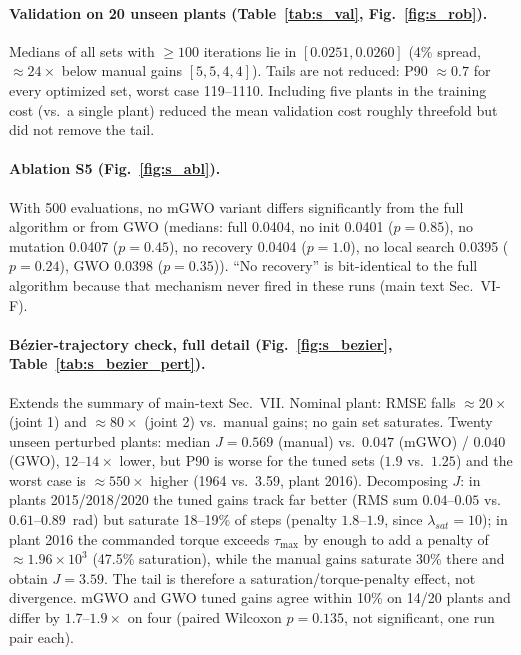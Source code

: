 \documentclass[10pt,journal,compsoc]{IEEEtran}
\newcommand{\mgwo}{mGWO}
\begin{document}
\paragraph{Validation on 20 unseen plants (Table~\ref{tab:s_val}, Fig.~\ref{fig:s_rob}).} Medians of all sets with $\ge100$ iterations lie in $[0.0251,0.0260]$ (4\% spread, $\approx24\times$ below manual gains $[5,5,4,4]$). Tails are not reduced: P90 $\approx0.7$ for every optimized set, worst case 119--1110. Including five plants in the training cost (vs.\ a single plant) reduced the mean validation cost roughly threefold but did not remove the tail.

\paragraph{Ablation S5 (Fig.~\ref{fig:s_abl}).} With 500 evaluations, no \mgwo{} variant differs significantly from the full algorithm or from GWO (medians: full 0.0404, no init 0.0401 ($p=0.85$), no mutation 0.0407 ($p=0.45$), no recovery 0.0404 ($p=1.0$), no local search 0.0395 ($p=0.24$), GWO 0.0398 ($p=0.35$)). ``No recovery'' is bit-identical to the full algorithm because that mechanism never fired in these runs (main text Sec.~VI-F).

\paragraph{B\'ezier-trajectory check, full detail (Fig.~\ref{fig:s_bezier}, Table~\ref{tab:s_bezier_pert}).} Extends the summary of main-text Sec.~VII. Nominal plant: RMSE falls $\approx20\times$ (joint 1) and $\approx80\times$ (joint 2) vs.\ manual gains; no gain set saturates. Twenty unseen perturbed plants: median $J=0.569$ (manual) vs.\ $0.047$ (\mgwo{}) / $0.040$ (GWO), $12$--$14\times$ lower, but P90 is worse for the tuned sets ($1.9$ vs.\ $1.25$) and the worst case is $\approx550\times$ higher (1964 vs.\ 3.59, plant 2016). Decomposing $J$: in plants 2015/2018/2020 the tuned gains track far better (RMS sum $0.04$--$0.05$ vs.\ $0.61$--$0.89$~rad) but saturate 18--19\% of steps (penalty $1.8$--$1.9$, since $\lambda_{sat}=10$); in plant 2016 the commanded torque exceeds $\tau_{\max}$ by enough to add a penalty of $\approx1.96\times10^3$ (47.5\% saturation), while the manual gains saturate 30\% there and obtain $J=3.59$. The tail is therefore a saturation/torque-penalty effect, not divergence. \mgwo{} and GWO tuned gains agree within 10\% on 14/20 plants and differ by $1.7$--$1.9\times$ on four (paired Wilcoxon $p=0.135$, not significant, one run pair each).
\end{document}
